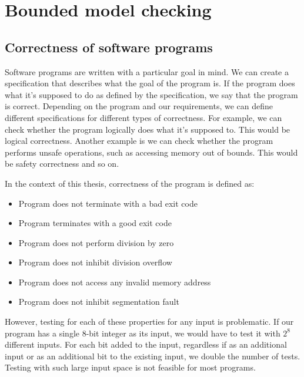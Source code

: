 \documentclass[12pt]{article}
\begin{document}
\section{Bounded model checking}

\subsection{Correctness of software programs}

Software programs are written with a particular goal in mind. We can create a 
specification that describes what the goal of the program is. If the program 
does what it's supposed to do as defined by the specification, we say that the
program is correct. Depending on the program and our requirements, we can
define different specifications for different types of correctness. For
example, we can check whether the program logically does what it's supposed to.
This would be logical correctness. Another example is we can check whether the
program performs unsafe operations, such as accessing memory out of bounds.
This would be safety correctness and so on.

In the context of this thesis, correctness of the program is defined as:

\begin{itemize}
    \item Program does not terminate with a bad exit code
    \item Program terminates with a good exit code
    \item Program does not perform division by zero
    \item Program does not inhibit division overflow
    \item Program does not access any invalid memory address
    \item Program does not inhibit segmentation fault
\end{itemize}

However, testing for each of these properties for any input is problematic. If
our program has a single 8-bit integer as its input, we would have to test it 
with $2^{8}$ different inputs. For each bit added to the input, regardless
if as an additional input or as an additional bit to the existing input, we
double the number of tests. Testing with such large input space is not feasible
for most programs.
\end{document}
